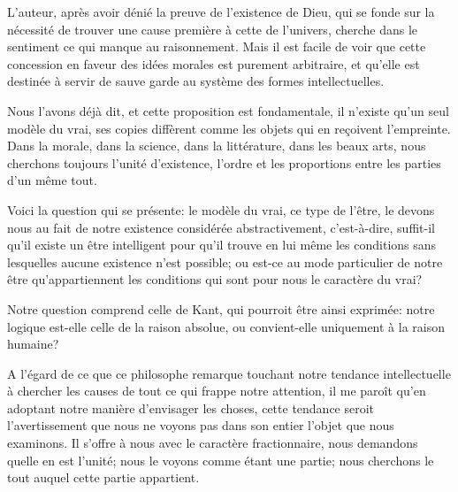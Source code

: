 \documentclass[11pt,a4paper]{article}
\begin{document}
L'auteur, après avoir dénié la preuve de l'existence de Dieu, qui se
fonde sur la nécessité de trouver une cause première à 
cette de l'univers, cherche  dans le sentiment ce
qui manque au raisonnement. Mais il est facile de voir que cette
concession en faveur des idées morales est purement arbitraire, et
qu'elle est  destinée à servir de sauve garde au
système des  formes intellectuelles.

Nous l'avons déjà dit, et cette proposition est fondamentale, il n'existe
qu'un seul modèle du vrai, ses copies diffèrent comme les objets qui en
reçoivent l'empreinte. Dans  la morale,
dans la science, dans la littérature, dans les beaux arts, nous cherchons
toujours l'unité d'existence, l'ordre et les proportions  entre les parties d'un même tout.

Voici la question qui se présente: le modèle du vrai, ce type de l'être,
le devons nous au fait de notre existence considérée abstractivement,
c'est-à-dire, suffit-il qu'il existe un être intelligent pour qu'il
trouve en lui même les conditions sans lesquelles aucune existence n'est
possible; ou est-ce au mode particulier de notre être qu'appartiennent
les conditions qui sont pour nous le caractère du vrai?

Notre question comprend celle de Kant,  qui pourroit
être ainsi exprimée: notre logique est-elle celle de la raison absolue,
ou convient-elle uniquement à la raison humaine?

A l'égard de ce que ce philosophe remarque touchant notre tendance
intellectuelle à chercher les causes de tout ce qui frappe notre
attention, il me paroît qu'en adoptant notre manière d'envisager les
choses, cette tendance  seroit l'avertissement que nous ne
voyons pas dans son entier l'objet que nous examinons. Il
 s'offre à nous avec le caractère fractionnaire,
nous demandons  quelle en est l'unité; nous
 le voyons comme étant une partie; nous cherchons
 le tout auquel cette partie appartient.
\end{document}
